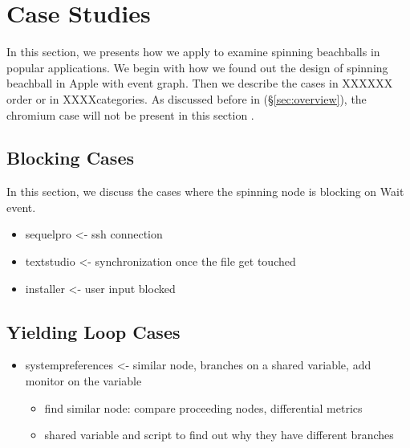 \section{Case Studies}\label{sec:casestudy}

In this section, we presents how we apply \xxx to examine spinning
beachballs in \nbug popular applications. We begin with how we found out the
design of spinning beachball in Apple with event graph. Then we describe
the cases in XXXXXX order or in XXXXcategories. As discussed before in
(\S\ref{sec:overview}), the chromium case will not be present in this section .



\subsection{Blocking Cases}
In this section, we discuss the cases where the spinning node is blocking on Wait event.
\begin{itemize}
\item sequelpro <- ssh connection
\item textstudio <- synchronization once the file get touched
\item installer <- user input blocked
\end{itemize}


\subsection{Yielding Loop Cases}
\begin{itemize}

\item systempreferences <- similar node, branches on a shared variable, add monitor on the variable
	\begin{itemize}
		\item find similar node: compare proceeding nodes, differential metrics
		\item shared variable and script to find out why they have different branches
	\end{itemize}
\end{itemize}


